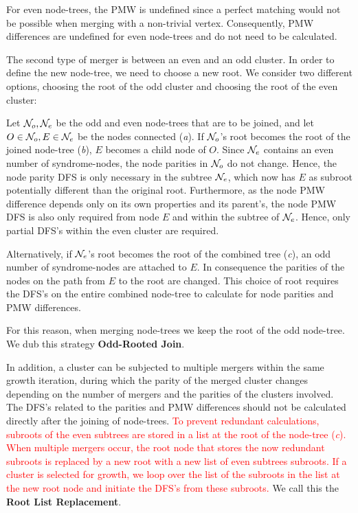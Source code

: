 For even node-trees, the PMW is undefined since a perfect matching would not be possible when merging with a non-trivial vertex. Consequently, PMW differences are undefined for even node-trees and do not need to be calculated. 

The second type of merger is between an even and an odd cluster. %
In order to define the new node-tree, we need to choose a new root. We consider two different options, choosing the root of the odd cluster and choosing the root of the even cluster:

Let $\mathcal{N}_o,\mathcal{N}_e$ be the odd and even node-trees that are to be joined, and let $O\in \mathcal{N}_o,E \in \mathcal{N}_e$ be the nodes connected (\emph{a}).
If $\mathcal{N}_o$'s root becomes the root of the joined node-tree (\emph{b}), $E$ becomes a child node of $O$. 
Since $\mathcal{N}_e$ contains an even number of syndrome-nodes, the node parities in $\mathcal{N}_o$ do not change. 
Hence, the node parity DFS is only necessary in the subtree $\mathcal{N}_e$, which now has $E$ as subroot potentially different than the original root. 
Furthermore, as the node PMW difference depends only on its own properties and its parent's, the node PMW DFS is also only required from node $E$ and within the subtree of $\mathcal{N}_e$. 
Hence, only partial DFS's within the even cluster are required. %

Alternatively, if $\mathcal{N}_e$'s root becomes the root of the combined tree (\emph{c}), an odd number of syndrome-nodes are attached to $E$. In consequence the parities of the nodes on the path from $E$ to the root are changed. This choice of root requires the DFS's on the entire combined node-tree to calculate for node parities and PMW differences. 

For this reason, when merging node-trees we keep the root of the odd node-tree. We dub this strategy \textbf{Odd-Rooted Join}. 

In addition, a cluster can be subjected to multiple mergers within the same growth iteration, during which the parity of the merged cluster changes depending on the number of mergers and the parities of the clusters involved. The DFS's related to the parities and PMW differences should not be calculated directly after the joining of node-trees. %
\textcolor{red}{To prevent redundant calculations, subroots of the even subtrees are stored in a list at the root of the node-tree (\emph{c}). When multiple mergers occur, the root node that stores the now redundant subroots is replaced by a new root with a new list of even subtrees subroots. If a cluster is selected for growth, we loop over the list of the subroots in the list at the new root node and initiate the DFS's from these subroots.} We call this the \textbf{Root List Replacement}. 


